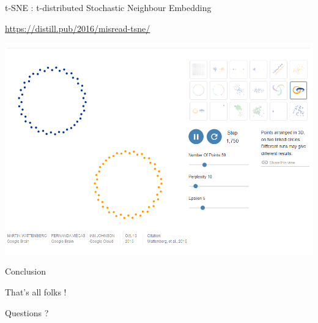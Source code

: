 \documentclass[french]{beamer}
\begin{document}
\begin{frame}{t-SNE : t-distributed Stochastic Neighbour Embedding}
\begin{center}
	\url{https://distill.pub/2016/misread-tsne/}
	
\includegraphics[width=.95\textwidth]{tsne}
\end{center}
\end{frame}


\begin{frame}[label=conclu]{Conclusion}
	\begin{center}
		\Huge{That's all folks !}
	
		\normalsize Questions ?
	\end{center}
\end{frame}



\end{document}
